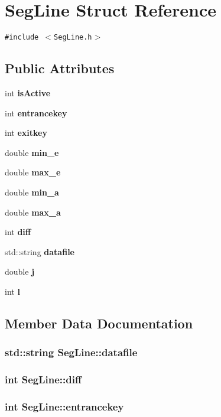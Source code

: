 \section{Seg\-Line Struct Reference}
\label{structSegLine}
{\tt \#include $<$Seg\-Line.h$>$}

\subsection*{Public Attributes}
\begin{CompactItemize}
\item 
int \bf{is\-Active}
\item 
int \bf{entrancekey}
\item 
int \bf{exitkey}
\item 
double \bf{min\_\-e}
\item 
double \bf{max\_\-e}
\item 
double \bf{min\_\-a}
\item 
double \bf{max\_\-a}
\item 
int \bf{diff}
\item 
std::string \bf{datafile}
\item 
double \bf{j}
\item 
int \bf{l}
\end{CompactItemize}


\subsection{Member Data Documentation}
\subsubsection{\setlength{\rightskip}{0pt plus 5cm}std::string \bf{Seg\-Line::datafile}}\label{structSegLine_e853961bcbd6b422c0d86536cea1dace}


\subsubsection{\setlength{\rightskip}{0pt plus 5cm}int \bf{Seg\-Line::diff}}\label{structSegLine_082c6f9b85896859acc9fee32218aa6d}


\subsubsection{\setlength{\rightskip}{0pt plus 5cm}int \bf{Seg\-Line::entrancekey}}\label{structSegLine_3f40dc4344c737df7c6175ac7535279f}


